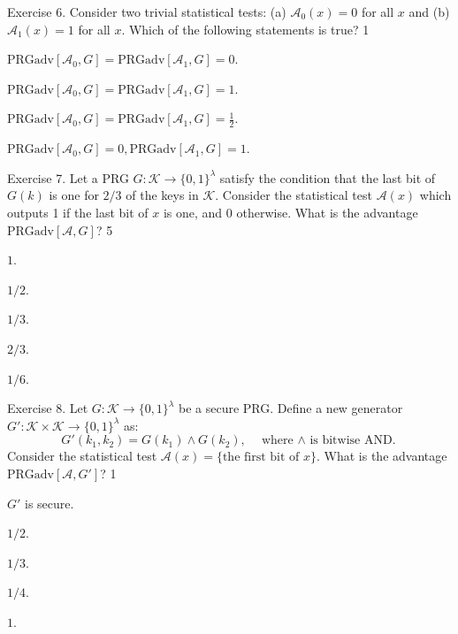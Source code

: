 \documentclass[../lecture-notes-148x210.tex]{subfiles}
\begin{document}
\begin{xexercise}
    {Exercise 6.}
    {Consider two trivial statistical tests: (a) $\mathcal{A}_0(x)=0$ for all 
    $x$ and (b) $\mathcal{A}_1(x)=1$ for all $x$. Which of the following statements is true?}
    {1}
    {
        \item $\text{PRGadv}[\mathcal{A}_0,G] = \text{PRGadv}[\mathcal{A}_1,G] = 0$.
        \item $\text{PRGadv}[\mathcal{A}_0,G] = \text{PRGadv}[\mathcal{A}_1,G] = 1$.
        \item $\text{PRGadv}[\mathcal{A}_0,G] = \text{PRGadv}[\mathcal{A}_1,G] = \frac{1}{2}$.
        \item $\text{PRGadv}[\mathcal{A}_0,G] = 0, \text{PRGadv}[\mathcal{A}_1,G] = 1$.
    }
\end{xexercise}

\begin{xexercise}
    {Exercise 7.}
    {Let a PRG $G: \mathcal{K} \to \{0,1\}^{\lambda}$ satisfy the condition that the last bit of $G(k)$ is one for $2/3$ of the keys in $\mathcal{K}$. Consider the statistical test $\mathcal{A}(x)$ which outputs 1 if the last bit of $x$ is one, and 0 otherwise. What is the advantage $\text{PRGadv}[\mathcal{A},G]$?}
    {5}
    {
        \item $1$.
        \item $1/2$.
        \item $1/3$.
        \item $2/3$.
        \item $1/6$.
    }
\end{xexercise}

\begin{xexercise}
    {Exercise 8.}
    {Let $G: \mathcal{K} \to \{0,1\}^{\lambda}$ be a secure PRG. Define a new generator $G': \mathcal{K} \times \mathcal{K} \to \{0,1\}^{\lambda}$ as: 
    \begin{equation*}
        G'(k_1,k_2) = G(k_1) \wedge G(k_2), \quad \text{where $\wedge$ is bitwise AND.}
    \end{equation*}
    Consider the statistical test $\mathcal{A}(x) = \{\text{the first bit of } x\}$. What is the advantage $\text{PRGadv}[\mathcal{A},G']$?}
    {1}
    {
        \item $G'$ is secure.
        \item $1/2$.
        \item $1/3$.
        \item $1/4$.
        \item $1$.
    }
\end{xexercise}
\end{document}
